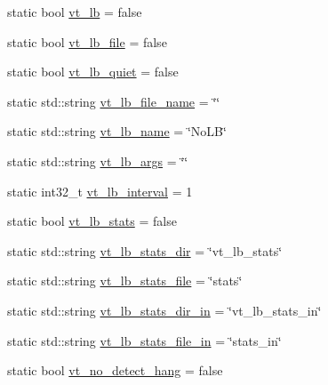 \begin{DoxyCompactItemize}
\item 
static bool \hyperlink{structvt_1_1arguments_1_1_arg_config_aab51ec67928526875a458f982e5fa90c}{vt\+\_\+lb} = false
\item 
static bool \hyperlink{structvt_1_1arguments_1_1_arg_config_a970d5784bfb69a34a04ec393fcd41cf6}{vt\+\_\+lb\+\_\+file} = false
\item 
static bool \hyperlink{structvt_1_1arguments_1_1_arg_config_ab0a9812811750643510b00fb7c0651a5}{vt\+\_\+lb\+\_\+quiet} = false
\item 
static std\+::string \hyperlink{structvt_1_1arguments_1_1_arg_config_adadeb5ba97bec396d11b5c856736bd3e}{vt\+\_\+lb\+\_\+file\+\_\+name} = \char`\"{}\char`\"{}
\item 
static std\+::string \hyperlink{structvt_1_1arguments_1_1_arg_config_a856cdf90d67403a08574e5a7a3ca792c}{vt\+\_\+lb\+\_\+name} = \char`\"{}No\+LB\char`\"{}
\item 
static std\+::string \hyperlink{structvt_1_1arguments_1_1_arg_config_aa9c190d04d0c6f9b3dac4ac56ac1a721}{vt\+\_\+lb\+\_\+args} = \char`\"{}\char`\"{}
\item 
static int32\+\_\+t \hyperlink{structvt_1_1arguments_1_1_arg_config_a273268a11a1525ad3754c72f5e6494b3}{vt\+\_\+lb\+\_\+interval} = 1
\item 
static bool \hyperlink{structvt_1_1arguments_1_1_arg_config_adf22250e9e2d60c5c57f41b8050f4697}{vt\+\_\+lb\+\_\+stats} = false
\item 
static std\+::string \hyperlink{structvt_1_1arguments_1_1_arg_config_a279d3953c475ea80bac06e2ed5ba6b5f}{vt\+\_\+lb\+\_\+stats\+\_\+dir} = \char`\"{}vt\+\_\+lb\+\_\+stats\char`\"{}
\item 
static std\+::string \hyperlink{structvt_1_1arguments_1_1_arg_config_ad6c76c8ec1dd43338a10f35929ce53f7}{vt\+\_\+lb\+\_\+stats\+\_\+file} = \char`\"{}stats\char`\"{}
\item 
static std\+::string \hyperlink{structvt_1_1arguments_1_1_arg_config_a2db08bf2d315dad981aaa9f5f79d31a5}{vt\+\_\+lb\+\_\+stats\+\_\+dir\+\_\+in} = \char`\"{}vt\+\_\+lb\+\_\+stats\+\_\+in\char`\"{}
\item 
static std\+::string \hyperlink{structvt_1_1arguments_1_1_arg_config_a7b294f12d448dcfe20f418db26a509bf}{vt\+\_\+lb\+\_\+stats\+\_\+file\+\_\+in} = \char`\"{}stats\+\_\+in\char`\"{}
\item 
static bool \hyperlink{structvt_1_1arguments_1_1_arg_config_a567d431e527d7a77c2bbddb4c52b781e}{vt\+\_\+no\+\_\+detect\+\_\+hang} = false
\item 

\end{DoxyCompactItemize}
